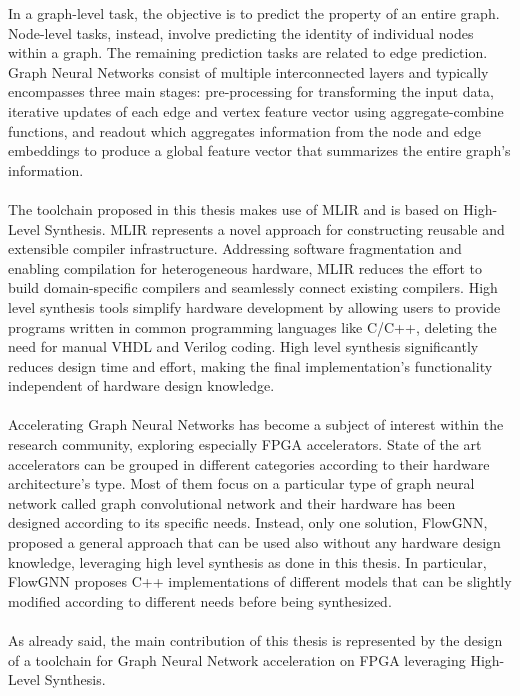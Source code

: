\documentclass{article}
\begin{document}
In a graph-level task, the objective is to predict the property of an entire graph. 
Node-level tasks, instead, involve predicting the identity of individual nodes within a graph. The remaining prediction tasks are related to edge prediction. 
Graph Neural Networks consist of multiple interconnected layers and typically encompasses three main stages: pre-processing for transforming the input data, iterative updates of each edge and vertex feature vector using aggregate-combine functions, and readout which aggregates information from the node and edge embeddings to produce a global feature vector that summarizes the entire graph's information.
\\
\\
\noindent
The toolchain proposed in this thesis makes use of MLIR and is based on High-Level Synthesis.
MLIR represents a novel approach for constructing reusable and extensible compiler infrastructure. 
Addressing software fragmentation and enabling compilation for heterogeneous hardware, MLIR reduces the effort to build domain-specific compilers and seamlessly connect existing compilers. 
High level synthesis tools simplify hardware development by allowing users to provide programs written in common programming languages like C/C++, deleting the need for manual VHDL and Verilog coding. 
High level synthesis significantly reduces design time and effort, making the final implementation’s functionality independent of hardware design knowledge. 
\\
\\
\noindent
Accelerating Graph Neural Networks has become a subject of interest within the research community, exploring especially FPGA accelerators. 
State of the art accelerators can be grouped in different categories according to their hardware architecture’s type. Most of them focus on a particular type of graph neural network called graph convolutional network and their hardware has been designed according to its specific needs.
Instead, only one solution, FlowGNN, proposed a general approach that can be used also without any hardware design knowledge, leveraging high level synthesis as done in this thesis. 
In particular, FlowGNN proposes C++ implementations of different models that can be slightly modified according to different needs before being synthesized.
\\
\\
\noindent
As already said, the main contribution of this thesis is represented by the design of a toolchain for Graph Neural Network acceleration on FPGA leveraging High-Level Synthesis. 
\end{document}
